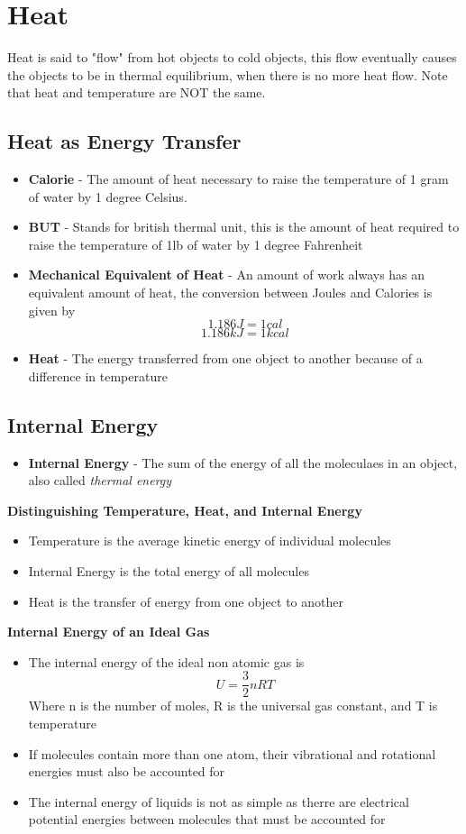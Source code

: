 \section{Heat}
Heat is said to "flow" from hot objects to cold objects, this flow eventually causes the objects to be in thermal equilibrium, when there is no more heat flow. Note that heat and temperature are NOT the same. 

\subsection{Heat as Energy Transfer}
\begin{itemize}
    \item \textbf{Calorie} - The amount of heat necessary to raise the temperature of 1 gram of water by 1 degree Celsius.
    \item \textbf{BUT} - Stands for british thermal unit, this is the amount of heat required to raise the temperature of 1lb of water by 1 degree Fahrenheit
     \item \textbf{Mechanical Equivalent of Heat} - An amount of work always has an equivalent amount of heat, the conversion between Joules and Calories is given by \[1.186J=1cal\] \[1.186kJ=1kcal\]
     \item \textbf{Heat} - The energy transferred from one object to another because of a difference in temperature
\end{itemize}

\subsection{Internal Energy}
\begin{itemize}
    \item \textbf{Internal Energy} - The sum of the energy of all the moleculaes in an object, also called \emph{thermal energy}
\end{itemize}

\textbf{Distinguishing Temperature, Heat, and Internal Energy}
\begin{itemize}
    \item Temperature is the average kinetic energy of individual molecules
    \item Internal Energy is the total energy of all molecules
    \item Heat is the transfer of energy from one object to another
\end{itemize}

\textbf{Internal Energy of an Ideal Gas}
\begin{itemize}
    \item The internal energy of the ideal non atomic gas is \[U=\frac{3}{2}nRT\] Where n is the number of moles, R is the universal gas constant, and T is temperature
    \item If molecules contain more than one atom, their vibrational and rotational energies must also be accounted for
    \item The internal energy of liquids is not as simple as therre are electrical potential energies between molecules that must be accounted for
\end{itemize}

